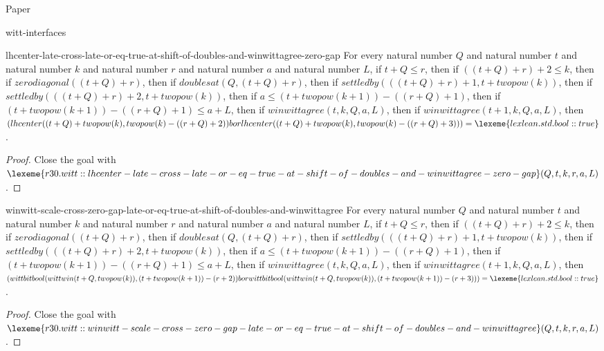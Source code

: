 \begin{lexlean}{Paper}
\begin{section}{witt-interfaces}
  \begin{theorem}{lhcenter-late-cross-late-or-eq-true-at-shift-of-doubles-and-winwittagree-zero-gap}
  For every natural number \(Q\) and natural number \(t\) and natural number \(k\) and natural number \(r\) and natural number \(a\) and natural number \(L\), if \(t + Q ≤ r\), then if \(((t + Q) + r) + 2 ≤ k\), then if \(zerodiagonal((t + Q) + r)\), then if \(doublesat(Q, (t + Q) + r)\), then if \(settledby(((t + Q) + r) + 1, t + twopow(k))\), then if \(settledby(((t + Q) + r) + 2, t + twopow(k))\), then if \(a ≤ (t + twopow(k + 1)) - ((r + Q) + 1)\), then if \((t + twopow(k + 1)) - ((r + Q) + 1) ≤ a + L\), then if \(winwittagree(t, k, Q, a, L)\), then if \(winwittagree(t + 1, k, Q, a, L)\), then \((lhcenter((t + Q) + twopow(k), twopow(k) - ((r + Q) + 2)) bor lhcenter((t + Q) + twopow(k), twopow(k) - ((r + Q) + 3))) = \lexeme{lexlean.std.bool::true}\).
  \begin{proof}
  Close the goal with \(\lexeme{r30.witt::lhcenter-late-cross-late-or-eq-true-at-shift-of-doubles-and-winwittagree-zero-gap}(Q, t, k, r, a, L)\).
  \end{proof}
  \end{theorem}

  \begin{theorem}{winwitt-scale-cross-zero-gap-late-or-eq-true-at-shift-of-doubles-and-winwittagree}
  For every natural number \(Q\) and natural number \(t\) and natural number \(k\) and natural number \(r\) and natural number \(a\) and natural number \(L\), if \(t + Q ≤ r\), then if \(((t + Q) + r) + 2 ≤ k\), then if \(zerodiagonal((t + Q) + r)\), then if \(doublesat(Q, (t + Q) + r)\), then if \(settledby(((t + Q) + r) + 1, t + twopow(k))\), then if \(settledby(((t + Q) + r) + 2, t + twopow(k))\), then if \(a ≤ (t + twopow(k + 1)) - ((r + Q) + 1)\), then if \((t + twopow(k + 1)) - ((r + Q) + 1) ≤ a + L\), then if \(winwittagree(t, k, Q, a, L)\), then if \(winwittagree(t + 1, k, Q, a, L)\), then \((wittbitbool(wittwin(t + Q, twopow(k)), (t + twopow(k + 1)) - (r + 2)) bor wittbitbool(wittwin(t + Q, twopow(k)), (t + twopow(k + 1)) - (r + 3))) = \lexeme{lexlean.std.bool::true}\).
  \begin{proof}
  Close the goal with \(\lexeme{r30.witt::winwitt-scale-cross-zero-gap-late-or-eq-true-at-shift-of-doubles-and-winwittagree}(Q, t, k, r, a, L)\).
  \end{proof}
  \end{theorem}


\end{section}
\end{lexlean}
